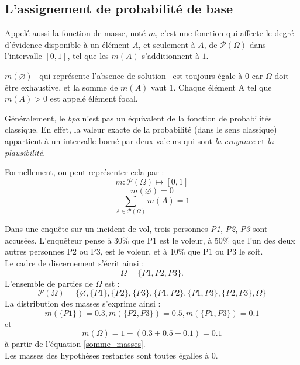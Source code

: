 \subsection{L’assignement de probabilité de base}

Appelé aussi la fonction de masse, noté $m$, c'est une fonction qui affecte le degré d’évidence
disponible à un élément $A$, et seulement à $A$, de $\mathcal{P}(\Omega)$ dans l’intervalle
$[0,1]$, tel que les $m(A)$ s’additionnent à $1$.

$m(\varnothing)$ --qui représente l’absence
de solution-- est toujours égale à $0$ car $\Omega$ doit être exhaustive, et la somme de $m(A)$
vaut $1$. Chaque élément A tel que $m(A) > 0$ est appelé élément focal.\cite{dubois1988theorie}

Généralement, le \emph{bpa} n’est pas un équivalent de la fonction de probabilités classique. En effet,
la valeur exacte de la probabilité (dans le sens classique) appartient à un intervalle borné par
deux valeurs qui sont \emph{la croyance} et \emph{la plausibilité}.\cite{sentz2002combination}

Formellement, on peut représenter cela par :
\begin{equation}
m : \mathcal{P}(\Omega) \mapsto [0,1]
\end{equation}
\begin{equation}
m(\varnothing) = 0
\end{equation}
\begin{equation} \label{somme_masses}
\sum_{A \in \mathcal{P}(\Omega)} m(A) = 1
\end{equation}

\begin{exemple}
Dans une enquête sur un incident de vol, trois personnes \textit{P1}, \textit{P2}, \textit{P3}
sont accusées. L’enquêteur pense à 30\% que P1 est le voleur, à 50\% que l’un des deux autres
personnes P2 ou P3, est le voleur, et à 10\% que P1 ou P3 le soit.\\
Le cadre de discernement s'écrit ainsi : $$\Omega = \{P1, P2, P3\}.$$
L'ensemble de parties de $\Omega$ est : $$\mathcal{P}(\Omega) = \{\varnothing, \{P1\}, \{P2\},
\{P3\}, \{P1, P2\}, \{P1, P3\}, \{P2, P3\}, \Omega\}$$
La distribution des masses s'exprime ainsi : $$m(\{P1\}) = 0.3, m(\{P2, P3\})  = 0.5,
m(\{P1, P3\}) = 0.1$$ et $$m(\Omega) = 1 - (0.3+0.5+0.1) = 0.1$$ à partir de l’équation \ref{somme_masses}.\\
Les masses des hypothèses restantes sont toutes égalles à $0$.
\end{exemple}

